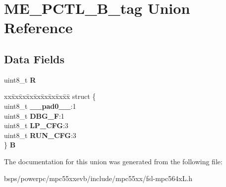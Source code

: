 \hypertarget{unionME__PCTL__8B__tag}{}\section{M\+E\+\_\+\+P\+C\+T\+L\+\_\+B\+\_\+tag Union Reference}
\label{unionME__PCTL__8B__tag}
\subsection*{Data Fields}
\begin{DoxyCompactItemize}
\item 
\mbox{\label{unionME__PCTL__8B__tag_adea1afa97bc056d49f4ca0206f1264b0}} 
uint8\+\_\+t {\bfseries R}
\item 
\mbox{\label{unionME__PCTL__8B__tag_a081808ba64f05f27238583e6ef9628a4}} 
\begin{tabbing}
xx\=xx\=xx\=xx\=xx\=xx\=xx\=xx\=xx\=\kill
struct \{\\
\>uint8\_t {\bfseries \_\_pad0\_\_}:1\\
\>uint8\_t {\bfseries DBG\_F}:1\\
\>uint8\_t {\bfseries LP\_CFG}:3\\
\>uint8\_t {\bfseries RUN\_CFG}:3\\
\} {\bfseries B}\\

\end{tabbing}\end{DoxyCompactItemize}


The documentation for this union was generated from the following file\+:\begin{DoxyCompactItemize}
\item 
bsps/powerpc/mpc55xxevb/include/mpc55xx/fsl-\/mpc564x\+L.\+h\end{DoxyCompactItemize}
